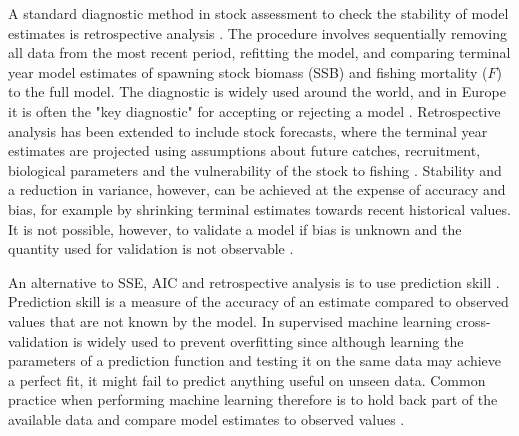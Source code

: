 \documentclass[12pt,halfline,a4paper,nonumbib]{ouparticle}
\begin{document}
A standard diagnostic method in stock assessment to check the stability of model estimates is retrospective analysis \parencite{hurtado2014looking}. The procedure involves sequentially removing all data from the most recent period, refitting the model, and comparing terminal year model estimates of spawning stock biomass (SSB) and fishing mortality ($F$) to the full model. The diagnostic is widely used around the world, and in Europe it is often the "key diagnostic" for accepting or rejecting a model \parencite{GFCM2020, ICES2019}. Retrospective analysis has been extended to include stock forecasts, where the terminal year estimates are projected using assumptions about future catches, recruitment, biological parameters and the vulnerability of the stock to fishing \parencite[e.g.][]{brooks2016retrospective}. Stability and a reduction in variance, however, can be achieved at the expense of accuracy and bias, for example by shrinking terminal estimates towards recent historical values. It is not possible, however, to validate a model if bias is unknown and the quantity used for validation is not observable \parencite{hodges1992you}. 

An alternative to SSE, AIC and retrospective analysis is to use prediction skill \parencite{glickman2000glossary}. Prediction skill is a measure of the accuracy of an estimate compared to observed values that are not known by the model. In supervised machine learning cross-validation is widely used to prevent overfitting since although learning the parameters of a prediction function and testing it on the same data may achieve a perfect fit, it might fail to predict anything useful on unseen data. Common practice when performing machine learning therefore is to hold back part of the available data and compare model estimates to observed values \parencite{jin2008current, weigel2008can, balmaseda1995decadal}. 
\end{document}
